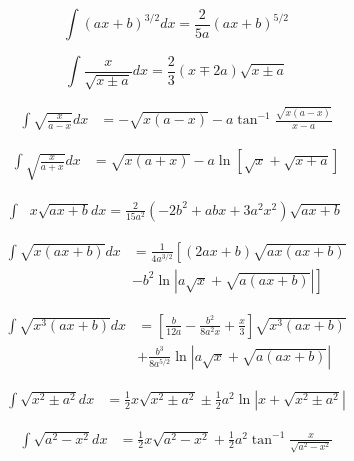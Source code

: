 \documentclass[11pt, letterpaper, notitlepage]{article}
\begin{document}
\begin{multicols}{2}
\begin{footnotesize}
\begin{equation}
\int (ax+b)^{3/2}dx =\frac{2}{5a}(ax+b)^{5/2}
\end{equation}

\begin{equation}
\int \frac{x}{\sqrt{x\pm a} } dx = \frac{2}{3}(x\mp 2a)\sqrt{x\pm a}
\end{equation}

\begin{align}
\int \sqrt{\frac{x}{a-x}}dx &=  -\sqrt{x(a-x)}
-a\tan^{-1}\frac{\sqrt{x(a-x)}}{x-a}
\end{align}

\begin{align}
\int \sqrt{\frac{x}{a+x}}dx &=  \sqrt{x(a+x)} 
-a\ln \left [ \sqrt{x} + \sqrt{x+a}\right] 
\end{align}

\begin{align}
\int &x \sqrt{ax + b}dx =
\frac{2}{15 a^2}(-2b^2+abx + 3 a^2 x^2)
\sqrt{ax+b}
\end{align}

\begin{align}
\int \sqrt{x(ax+b)} dx &= \frac{1}{4a^{3/2}}\left[(2ax + b)\sqrt{ax(ax+b)} \right. \nonumber
\\& \left.
-b^2 \ln \left| a\sqrt{x} + \sqrt{a(ax+b)} \right| \right ] 
\end{align}

\begin{align}
\int \sqrt{x^3(ax+b)} dx &=\left [ 
\frac{b}{12a}-
\frac{b^2}{8a^2x}+
\frac{x}{3}\right] 
\sqrt{x^3(ax+b)} \nonumber \\& + 
\frac{b^3}{8a^{5/2}}\ln \left | a\sqrt{x} + \sqrt{a(ax+b)} \right |
\end{align}

\begin{align}
\int\sqrt{x^2 \pm a^2} dx &= \frac{1}{2}x\sqrt{x^2\pm a^2} 
\pm\frac{1}{2}a^2 \ln \left | x + \sqrt{x^2\pm a^2} \right | 
\end{align}

\begin{align}
\int  \sqrt{a^2 - x^2} dx &= \frac{1}{2} x \sqrt{a^2-x^2} 
+\frac{1}{2}a^2\tan^{-1}\frac{x}{\sqrt{a^2-x^2}}
\end{align}


\end{footnotesize}
\end{multicols}
\end{document}
